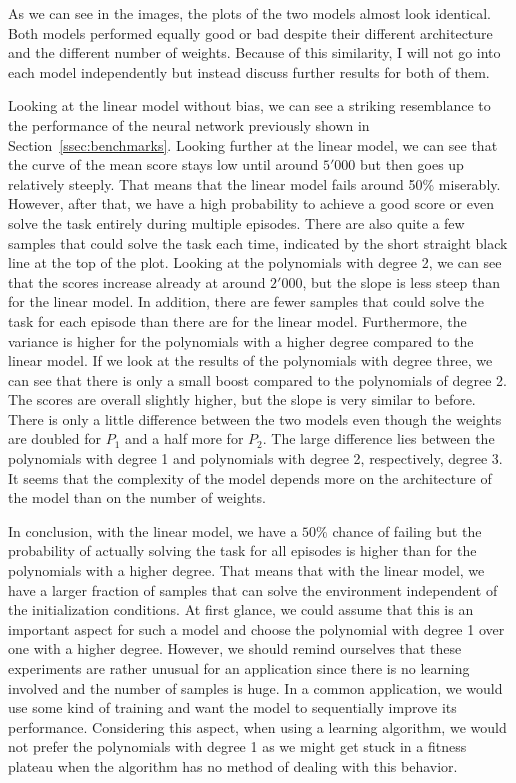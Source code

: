 As we can see in the images, the plots of the two models almost look identical. Both models performed equally good or bad despite their different architecture and the different number of weights. Because of this similarity, I will not go into each model independently but instead discuss further results for both of them.

Looking at the linear model without bias, we can see a striking resemblance to the performance of the neural network previously shown in Section~\ref{ssec:benchmarks}. Looking further at the linear model, we can see that the curve of the mean score stays low until around $5'000$ but then goes up relatively steeply. That means that the linear model fails around 50\% miserably. However, after that, we have a high probability to achieve a good score or even solve the task entirely during multiple episodes. There are also quite a few samples that could solve the task each time, indicated by the short straight black line at the top of the plot. Looking at the polynomials with degree 2, we can see that the scores increase already at around $2'000$, but the slope is less steep than for the linear model. In addition, there are fewer samples that could solve the task for each episode than there are for the linear model. Furthermore, the variance is higher for the polynomials with a higher degree compared to the linear model. If we look at the results of the polynomials with degree three, we can see that there is only a small boost compared to the polynomials of degree 2. The scores are overall slightly higher, but the slope is very similar to before. There is only a little difference between the two models even though the weights are doubled for $P_1$ and a half more for $P_2$. The large difference lies between the polynomials with degree 1 and polynomials with degree 2, respectively, degree 3. It seems that the complexity of the model depends more on the architecture of the model than on the number of weights.

In conclusion, with the linear model, we have a $50 \%$ chance of failing but the probability of actually solving the task for all episodes is higher than for the polynomials with a higher degree. That means that with the linear model, we have a larger fraction of samples that can solve the environment independent of the initialization conditions. At first glance, we could assume that this is an important aspect for such a model and choose the polynomial with degree 1 over one with a higher degree. However, we should remind ourselves that these experiments are rather unusual for an application since there is no learning involved and the number of samples is huge. In a common application, we would use some kind of training and want the model to sequentially improve its performance. Considering this aspect, when using a learning algorithm, we would not prefer the polynomials with degree 1 as we might get stuck in a fitness plateau when the algorithm has no method of dealing with this behavior.

